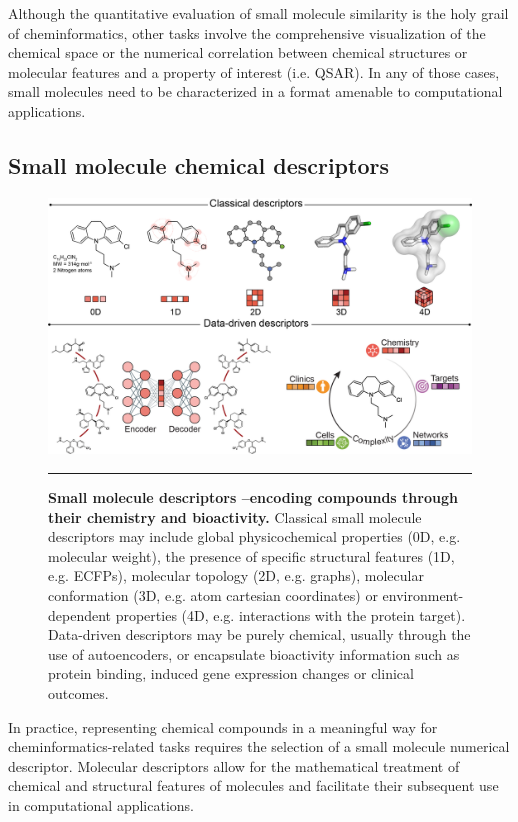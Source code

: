 Although the quantitative evaluation of small molecule similarity is the holy grail of cheminformatics, other tasks involve the comprehensive visualization of the chemical space or the numerical correlation between chemical structures or molecular features and a property of interest (i.e. QSAR\cite{lenselink_beyond_2017}). In any of those cases, small molecules need to be characterized in a format amenable to computational applications. 


\subsection{Small molecule chemical descriptors }
\label{Introduction_chemicaldescriptors}

\begin{figure}[t!]
  \centering
  \includegraphics[width=\linewidth]{figures/Introduction/figure1_COCB.png}
  \caption{
    \textbf{Small molecule descriptors --encoding compounds through their chemistry and bioactivity.} 
     Classical small molecule descriptors may include global physicochemical properties (0D, e.g. molecular weight), the presence of specific structural features (1D, e.g. ECFPs), molecular topology (2D, e.g. graphs), molecular conformation (3D, e.g. atom cartesian coordinates) or environment-dependent properties (4D, e.g. interactions with the protein target). Data-driven descriptors may be purely chemical, usually through the use of autoencoders, or encapsulate bioactivity information such as protein binding, induced gene expression changes or clinical outcomes.
  }
  \rule[0ex]{\textwidth}{0.5pt}
  \vspace{-5mm}
  \label{Introduction_Fig2}
\end{figure}

In practice, representing chemical compounds in a meaningful way for cheminformatics-related tasks requires the selection of a small molecule numerical descriptor. Molecular descriptors allow for the mathematical treatment of chemical and structural features of molecules and facilitate their subsequent use in computational applications. 


